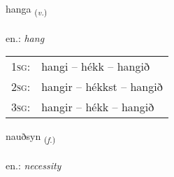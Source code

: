 \documentclass[frontgrid, backgrid]{flacards}\usepackage[]{graphicx}\usepackage[]{xcolor}
\begin{document}
\renewcommand{\flhead}{\vskip5pt \fboxsep=0pt {\small\bfseries\footnotesize Sagnorð | Verb}}
\renewcommand{\fcfoot}{\vskip5pt \fboxsep=0pt \hspace{2pt}{\small\bfseries\footnotesize 2K}}

\renewcommand{\blhead}{\vskip5pt {\small\bfseries\footnotesize Sagnorð | Verb }}
\renewcommand{\bcfoot}{\vskip5pt \hspace{2pt}{\small\bfseries\footnotesize 2K}}


{hanga \small{\textsubscript{(\textit{v.})}} \\[1ex] %
\textphonetic{[hauŋka]} \\
en.: \emph{hang} \\  [2ex]
\renewcommand*{\arraystretch}{0.8}
\begin{tabular}{p{1cm}l}
\textsc{1sg}: & hangi -- hékk -- hangið \\ 
\textsc{2sg}: & hangir -- hékkst -- hangið \\ 
\textsc{3sg}: & hangir -- hékk -- hangið \\ 
\end{tabular}
}

\renewcommand{\flhead}{\vskip5pt \fboxsep=0pt {\small\bfseries\footnotesize Nafnorð | Noun}}
\renewcommand{\fcfoot}{\vskip5pt \fboxsep=0pt \hspace{2pt}{\small\bfseries\footnotesize 2K}}

\renewcommand{\blhead}{\vskip5pt {\small\bfseries\footnotesize Nafnorð | Noun }}
\renewcommand{\bcfoot}{\vskip5pt \hspace{2pt}{\small\bfseries\footnotesize 2K}}


{nauðsyn \small{\textsubscript{(\textit{f.})}} \\[1ex] %
\textphonetic{[nœiðsɪn]} \\
en.: \emph{necessity} \\  [2ex]
\renewcommand*{\arraystretch}{0.8}
}
\end{document}
